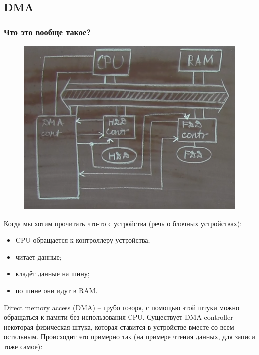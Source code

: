 \documentclass[12pt]{report}
\begin{document}
\subsection*{DMA}

\subsubsection{Что это вообще такое?}

\begin{figure}[H]
	\begin{center}
		\includegraphics[scale=0.6]{img/dma-cpu.png}
	\end{center}
	\label{fig:1}
\end{figure}

Когда мы хотим прочитать что-то с устройства (речь о блочных устройствах):

\begin{itemize}
	\item CPU обращается к контроллеру устройства;
	\item читает данные;
	\item кладёт данные на шину;
	\item по шине они идут в RAM.
\end{itemize}

Direct memory access (DMA) -- грубо говоря, с помощью этой штуки можно обращаться к памяти без использования CPU. Существует DMA controller -- некоторая физическая штука, которая ставится в устройстве вместе со всем остальным. Происходит это примерно так (на примере чтения данных, для записи тоже самое):
\end{document}

